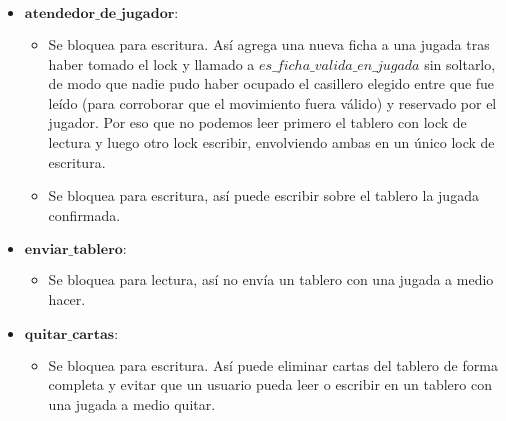 \begin{itemize}

\item $\mathbf{atendedor\_de\_jugador}:$

\begin{itemize}
\item Se bloquea para escritura. Así agrega una nueva ficha a una jugada tras haber tomado el lock y llamado a $es\_ficha\_valida\_en\_jugada$ sin soltarlo, de modo que nadie pudo haber ocupado el casillero elegido entre que fue leído (para corroborar que el movimiento fuera válido) y reservado por el jugador. Por eso que no podemos leer primero el tablero con lock de lectura y luego otro lock escribir, envolviendo ambas en un único lock de escritura.

\item Se bloquea para escritura, así puede escribir sobre el tablero la jugada confirmada.

\end{itemize}

\item $\mathbf{enviar\_tablero}:$

\begin{itemize}

\item Se bloquea para lectura, así no envía un tablero con una jugada a medio hacer.

\end{itemize}

\item $\mathbf{quitar\_cartas:}$

\begin{itemize}

\item Se bloquea para escritura. Así puede eliminar cartas del tablero de forma completa y evitar que un usuario pueda leer o escribir en un tablero con una jugada a medio quitar.

\end{itemize}

\end{itemize}
